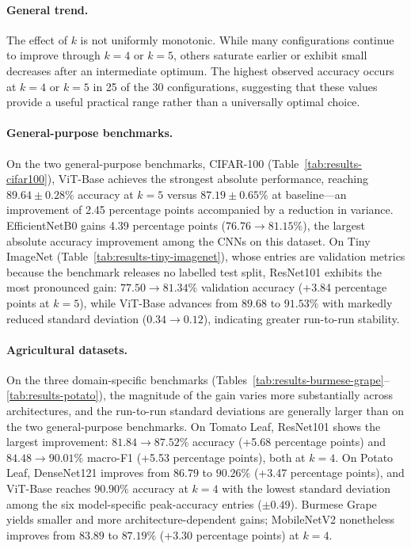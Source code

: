 \documentclass[runningheads]{llncs}
\begin{document}
\paragraph{General trend.}
The effect of $k$ is not uniformly monotonic. While many configurations
continue to improve through $k=4$ or $k=5$, others saturate earlier or
exhibit small decreases after an intermediate optimum. The highest observed
accuracy occurs at $k=4$ or $k=5$ in 25 of the 30 configurations, suggesting
that these values provide a useful practical range rather than a universally
optimal choice.

\paragraph{General-purpose benchmarks.}
On the two general-purpose benchmarks, CIFAR-100 (Table~\ref{tab:results-cifar100}), ViT-Base achieves the
strongest absolute performance, reaching $89.64\pm0.28\%$ accuracy at $k{=}5$
versus $87.19\pm0.65\%$ at baseline—an improvement of 2.45 percentage points
accompanied by a reduction in variance.
EfficientNetB0 gains 4.39 percentage points ($76.76 \to 81.15\%$), the largest absolute
accuracy improvement among the CNNs on this dataset.
On Tiny ImageNet (Table~\ref{tab:results-tiny-imagenet}), whose entries are
validation metrics because the benchmark releases no labelled test split,
ResNet101 exhibits the most pronounced gain: $77.50 \to 81.34\%$ validation
accuracy (+3.84 percentage points at $k{=}5$),
while ViT-Base advances from $89.68$ to $91.53\%$ with markedly reduced
standard deviation ($0.34 \to 0.12$), indicating greater run-to-run stability.

\paragraph{Agricultural datasets.}
On the three domain-specific benchmarks
(Tables~\ref{tab:results-burmese-grape}--\ref{tab:results-potato}), the
magnitude of the gain varies more substantially across architectures, and
the run-to-run standard deviations are generally larger than on the two
general-purpose benchmarks.
On Tomato Leaf, ResNet101 shows the largest improvement: $81.84 \to 87.52\%$
accuracy (+5.68 percentage points) and $84.48 \to 90.01\%$ macro-F1 (+5.53 percentage points), both at $k{=}4$.
On Potato Leaf, DenseNet121 improves from $86.79$ to $90.26\%$ (+3.47 percentage points),
and ViT-Base reaches $90.90\%$ accuracy at $k{=}4$ with the lowest
standard deviation among the six model-specific peak-accuracy entries
($\pm0.49$).
Burmese Grape yields smaller and more architecture-dependent gains;
MobileNetV2 nonetheless
improves from $83.89$ to $87.19\%$ (+3.30 percentage points) at $k{=}4$.
\end{document}
